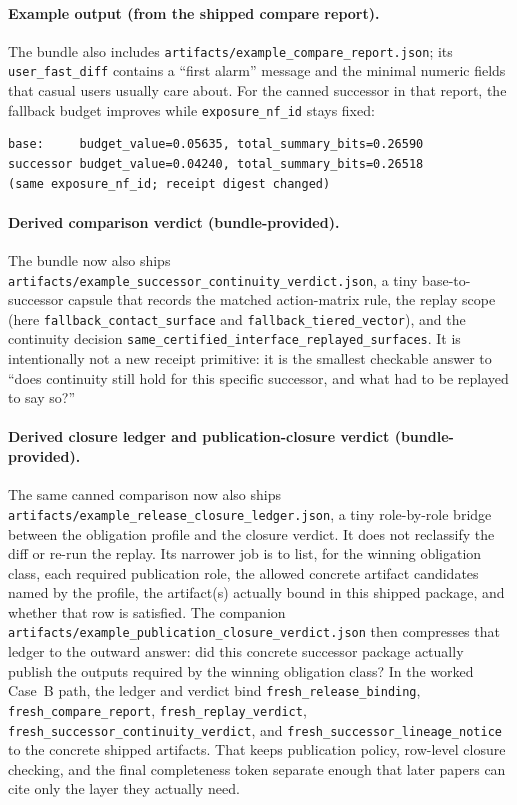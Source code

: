 \documentclass[11pt]{article}
\begin{document}
\paragraph{Example output (from the shipped compare report).}
The bundle also includes \texttt{artifacts/example\_compare\_report.json}; its \texttt{user\_fast\_diff} contains a ``first alarm'' message and the minimal numeric fields that casual users usually care about. For the canned successor in that report, the fallback budget improves while \texttt{exposure\_nf\_id} stays fixed:
\begin{verbatim}
base:     budget_value=0.05635, total_summary_bits=0.26590
successor budget_value=0.04240, total_summary_bits=0.26518
(same exposure_nf_id; receipt digest changed)
\end{verbatim}

\paragraph{Derived comparison verdict (bundle-provided).}
The bundle now also ships \texttt{artifacts/example\_successor\_continuity\_verdict.json}, a tiny base-to-successor capsule that records the matched action-matrix rule, the replay scope (here \texttt{fallback\_contact\_surface} and \texttt{fallback\_tiered\_vector}), and the continuity decision \texttt{same\_certified\_interface\_replayed\_surfaces}. It is intentionally not a new receipt primitive: it is the smallest checkable answer to ``does continuity still hold for this specific successor, and what had to be replayed to say so?''

\paragraph{Derived closure ledger and publication-closure verdict (bundle-provided).}
The same canned comparison now also ships \texttt{artifacts/example\_release\_closure\_ledger.json}, a tiny role-by-role bridge between the obligation profile and the closure verdict. It does not reclassify the diff or re-run the replay. Its narrower job is to list, for the winning obligation class, each required publication role, the allowed concrete artifact candidates named by the profile, the artifact(s) actually bound in this shipped package, and whether that row is satisfied. The companion \texttt{artifacts/example\_publication\_closure\_verdict.json} then compresses that ledger to the outward answer: did this concrete successor package actually publish the outputs required by the winning obligation class? In the worked Case~B path, the ledger and verdict bind \texttt{fresh\_release\_binding}, \texttt{fresh\_compare\_report}, \texttt{fresh\_replay\_verdict}, \texttt{fresh\_successor\_continuity\_verdict}, and \texttt{fresh\_successor\_lineage\_notice} to the concrete shipped artifacts. That keeps publication policy, row-level closure checking, and the final completeness token separate enough that later papers can cite only the layer they actually need.\cite{series:releaseclosure}
\end{document}
